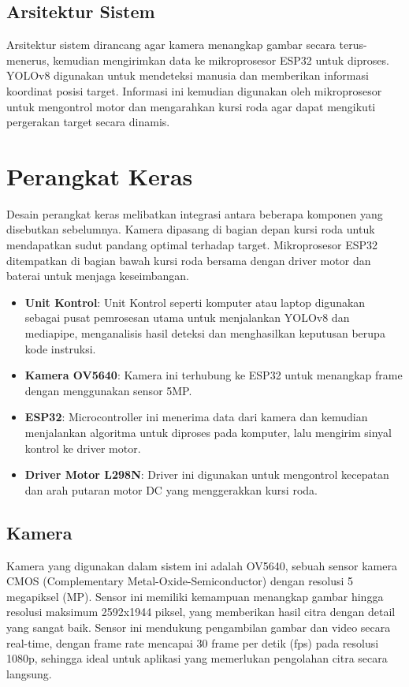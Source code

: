 \subsection{Arsitektur Sistem}
\label{subsec:arsitektursistem}

Arsitektur sistem dirancang agar kamera menangkap gambar secara terus-menerus, kemudian mengirimkan data ke mikroprosesor ESP32 untuk diproses. YOLOv8 digunakan untuk mendeteksi manusia dan memberikan informasi koordinat posisi target. Informasi ini kemudian digunakan oleh mikroprosesor untuk mengontrol motor dan mengarahkan kursi roda agar dapat mengikuti pergerakan target secara dinamis.

\section{Perangkat Keras}
\label{sec:perangkathardware}

Desain perangkat keras melibatkan integrasi antara beberapa komponen yang disebutkan sebelumnya. Kamera dipasang di bagian depan kursi roda untuk mendapatkan sudut pandang optimal terhadap target. Mikroprosesor ESP32 ditempatkan di bagian bawah kursi roda bersama dengan driver motor dan baterai untuk menjaga keseimbangan.

\begin{itemize}[nolistsep]
    \item \textbf{Unit Kontrol}: Unit Kontrol seperti komputer atau laptop digunakan sebagai pusat pemrosesan utama untuk menjalankan YOLOv8 dan mediapipe, menganalisis hasil deteksi dan menghasilkan keputusan berupa kode instruksi.
    \item \textbf{Kamera OV5640}: Kamera ini terhubung ke ESP32 untuk menangkap frame dengan menggunakan sensor 5MP.
    \item \textbf{ESP32}: Microcontroller ini menerima data dari kamera dan kemudian menjalankan algoritma untuk diproses pada komputer, lalu mengirim sinyal kontrol ke driver motor.
    \item \textbf{Driver Motor L298N}: Driver ini digunakan untuk mengontrol kecepatan dan arah putaran motor DC yang menggerakkan kursi roda.
\end{itemize}

\subsection{Kamera}
\label{subsec:kamera}
Kamera yang digunakan dalam sistem ini adalah OV5640, sebuah sensor kamera CMOS (Complementary Metal-Oxide-Semiconductor) dengan resolusi 5 megapiksel (MP). Sensor ini memiliki kemampuan menangkap gambar hingga resolusi maksimum 2592x1944 piksel, yang memberikan hasil citra dengan detail yang sangat baik. Sensor ini mendukung pengambilan gambar dan video secara real-time, dengan frame rate mencapai 30 frame per detik (fps) pada resolusi 1080p, sehingga ideal untuk aplikasi yang memerlukan pengolahan citra secara langsung.

